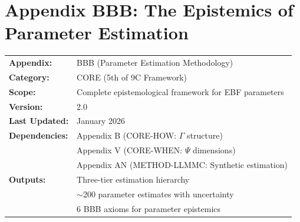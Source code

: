 \section{Appendix BBB: The Epistemics of Parameter Estimation}
\label{app:bbb-estimation}


\begin{tcolorbox}[colback=blue!5!white, colframe=blue!75!black,
    title=\textbf{Appendix BBB: CORE-WHERE}]

\begin{tabular}{@{}ll@{}}
\textbf{Appendix:} & BBB (Parameter Estimation Methodology) \\
\textbf{Category:} & CORE (5th of 9C Framework) \\
\textbf{Scope:} & Complete epistemological framework for EBF parameters \\
\textbf{Version:} & 2.0 \\
\textbf{Last Updated:} & January 2026 \\
\textbf{Dependencies:} & Appendix B (CORE-HOW: $\Gamma$ structure) \\
                       & Appendix V (CORE-WHEN: $\Psi$ dimensions) \\
                       & Appendix AN (METHOD-LLMMC: Synthetic estimation) \\
\textbf{Outputs:} & Three-tier estimation hierarchy \\
                  & $\sim$200 parameter estimates with uncertainty \\
                  & 6 BBB axioms for parameter epistemics \\
\end{tabular}

\end{tcolorbox}


